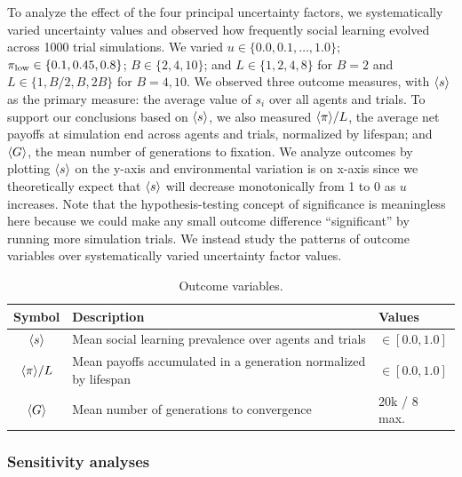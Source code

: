 \documentclass[letterpaper,11.5pt]{scrartcl}
\begin{document}
To analyze the effect of the four principal uncertainty factors, we systematically
varied uncertainty values and observed how frequently social learning evolved across
1000 trial simulations. We varied $u \in
\{0.0, 0.1, \ldots, 1.0\}$; $\pi_{\mathrm{low}} \in \{0.1, 0.45, 0.8\}$; $B \in \{2, 4, 10\}$;
and $L \in \{1,2,4,8\}$ for $B=2$ and $L \in \{1,B/2,B,2B\}$ for $B=4,10$.  We
observed three outcome measures, with $\langle s \rangle$ as the primary measure: 
the average value of $s_i$ over all agents and trials. To support our conclusions
based on $\langle s \rangle$, we also measured $\langle \pi \rangle / L$, the average net 
payoffs at simulation end across agents and trials, normalized by lifespan; 
and $\langle G \rangle$, the mean
number of generations to fixation. We analyze outcomes by
plotting $\langle s \rangle$ on the y-axis and environmental variation is on x-axis since we
theoretically expect that $\langle s \rangle$ will decrease monotonically from 1 to 0 as $u$
increases. Note that the hypothesis-testing concept of significance is meaningless
here because we could make any small outcome difference ``significant'' by running
more simulation trials.  We instead study the patterns of outcome variables over
systematically varied uncertainty factor values. 

\begin{table}[h]
    \caption{Outcome variables.}
    \label{tab:outcomeVariables}
    \centering %
    \begin{tabular}{cp{4.25in}p{0.85in}} \toprule

        Symbol & Description & Values \\ 

        \midrule  

        $\langle s \rangle$ & Mean social learning prevalence over agents and trials
                  & $\in [0.0, 1.0]$ \\

        $\langle \pi \rangle / L$ & Mean payoffs accumulated in a generation normalized by
        lifespan & $\in [0.0, 1.0]$ \\

        $\langle G \rangle$ & Mean number of generations to convergence & 20k / 8 max. \\
        \bottomrule
    \end{tabular}
\end{table}


\subsubsection{Sensitivity analyses}
\end{document}
